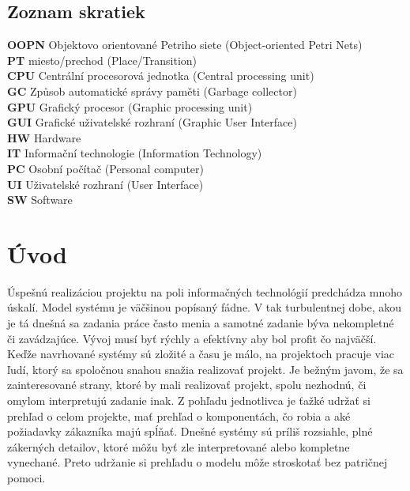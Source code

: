 \theoremstyle{definition}
\newtheorem{defn}{Definícia}[section]
\newtheorem{note}{Poznámka}[section]
\newtheorem{exmpl}{Príklad}[section]

\newpage
\section*{Zoznam skratiek}
\textbf{OOPN} Objektovo orientované Petriho siete (Object-oriented Petri Nets)\\
\textbf{PT} miesto/prechod (Place/Transition)\\
\textbf{CPU} Centrální procesorová jednotka (Central processing unit)\\
\textbf{GC} Způsob automatické správy paměti (Garbage collector)\\
\textbf{GPU} Grafický procesor (Graphic processing unit)\\
\textbf{GUI} Grafické uživatelské rozhraní (Graphic User Interface)\\
\textbf{HW} Hardware\\
\textbf{IT} Informační technologie (Information Technology)\\
\textbf{PC} Osobní počítač (Personal computer)\\
\textbf{UI} Uživatelské rozhraní (User Interface)\\
\textbf{SW} Software\\
\newpage

\chapter{Úvod}

Úspešnú realizáciou projektu na poli informačných technológií predchádza mnoho úskalí. Model systému je väčšinou popísaný fádne. V tak turbulentnej dobe, akou je tá dnešná sa zadania práce často menia a samotné zadanie býva nekompletné či zavádzajúce. Vývoj musí byť rýchly a efektívny aby bol profit čo najväčší. Keďže navrhované systémy sú zložité a času je málo, na projektoch pracuje viac ľudí, ktorý sa spoločnou snahou snažia realizovať projekt. Je bežným javom, že sa zainteresované strany, ktoré by mali realizovať projekt, spolu nezhodnú, či omylom interpretujú zadanie inak. Z pohľadu jednotlivca je ťažké udržať si prehľad o celom projekte, mať prehľad o komponentách, čo robia a aké požiadavky zákazníka majú spĺňať. Dnešné systémy sú príliš rozsiahle, plné zákerných detailov, ktoré môžu byť zle interpretované alebo kompletne vynechané. Preto udržanie si prehľadu o modelu môže stroskotať bez patričnej pomoci.

